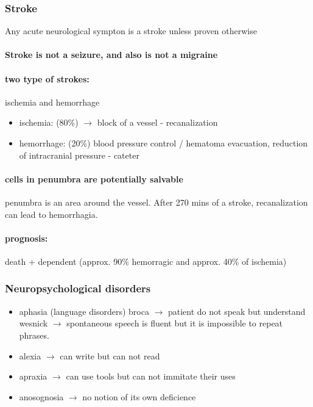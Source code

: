 \documentclass[12pt,article,oneside,a4paper]{memoir}
\begin{document}
\subsubsection{Stroke} 
Any acute neurological sympton is a stroke unless proven otherwise
\paragraph{Stroke is not a seizure, and also is not a migraine}
\paragraph{two type of strokes:} ischemia and hemorrhage
\begin{itemize}
\item ischemia: (80\%) $\rightarrow$ block of a vessel - recanalization
\item hemorrhage: (20\%) blood pressure control / hematoma evacuation, reduction of intracranial pressure - cateter
\end{itemize}
\paragraph{cells in penumbra are potentially salvable} penumbra is an area around the vessel.
After 270 mins of a stroke, recanalization can lead to  hemorrhagia.
\paragraph{prognosis:} death + dependent (approx. 90\% hemorragic and approx. 40\% of ischemia)

\subsubsection{Neuropsychological disorders }
\begin{itemize}
\item aphasia (language disorders)
\subitem broca $\rightarrow$ patient do not speak but understand
\subitem wesnick $\rightarrow$ spontaneous speech is fluent but it is impossible to repeat phrases.
\item alexia $\rightarrow$ can write but can not read
\item apraxia $\rightarrow$ can use tools but can not immitate their uses
\item anosognosia $\rightarrow$ no notion of its own deficience
\end{itemize}

\newpage
\end{document}
